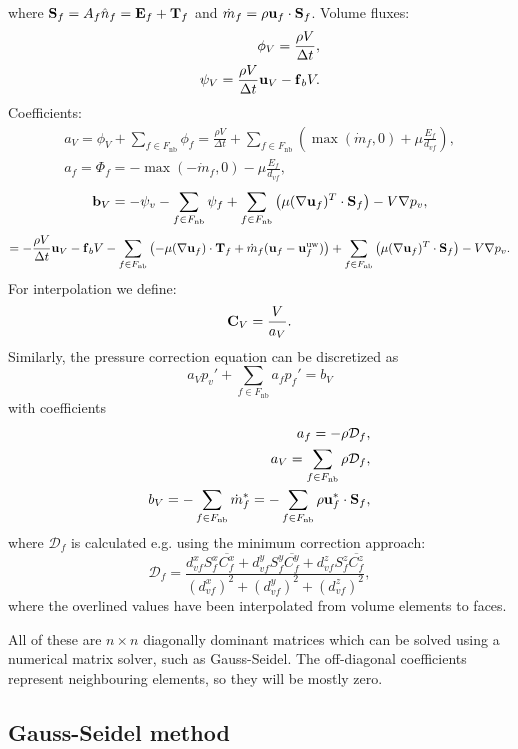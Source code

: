 \documentclass[12pt]{article}
\newcommand{\lb}{\left(}
\newcommand{\rb}{\right)}
\newcommand{\vb}[1]{\text{\textbf{#1}}}
\newcommand{\x}{\text}
\newcommand{\fnb}{F_{\x{nb}}}
\begin{document}
where $\vb S_f = A_f \hat n_f = \vb E_f + \vb T_f$ and $\dot m_f = \rho \vb u_f \cdot \vb S_f$.
Volume fluxes:
\begin{align}
  \phi_V = \frac{\rho V}{\Delta t}, \\
  \psi_V = \frac{\rho V}{\Delta t} \vb u_V - \vb f_b V.
\end{align}
Coefficients:
\begin{align}
  a_V = \phi_V + \sum_{f \in \fnb} \phi_f = \frac{\rho V}{\Delta t} + \sum_{f \in \fnb} \lb \max(\dot m_f, 0) + \mu \frac{E_f}{d_{vf}} \rb, \\
  a_f = \Phi_f = -\max(-\dot m_f, 0) - \mu \frac{E_f}{d_{vf}},
\end{align}
\begin{equation}
  \vb b_V = -\psi_v - \sum_{f \in \fnb} \psi_f + \sum_{f \in \fnb} \lb \mu (\nabla \vb u_f)^T \cdot \vb S_f \rb - V \nabla p_v,
\end{equation}
$$
= - \frac{\rho V}{\Delta t} \vb u_V - \vb f_b V - \sum_{f \in \fnb} \lb - \mu (\nabla \vb u_f) \cdot \vb T_f + \dot m_f (\vb u_f - \vb u_f^{\text{uw}}) \rb + \sum_{f \in \fnb} \lb \mu (\nabla \vb u_f)^T \cdot \vb S_f \rb - V \nabla p_v.
$$
For interpolation we define:
$$
\vb C_V = \frac{V}{a_V}.
$$
Similarly, the pressure correction equation can be discretized as \cite{mou}
\begin{equation}
  a_V p_v' + \sum_{f \in \fnb} a_f p_f' = b_V
\end{equation}
with coefficients
\begin{align}
  a_f = -\rho \mathcal{D}_f, \\
  a_V = \sum_{f \in \fnb} \rho \mathcal{D}_f,\\
  b_V = - \sum_{f \in \fnb} \dot m_f^* = - \sum_{f \in \fnb} \rho \vb u_f^* \cdot \vb S_f,
\end{align}
where $\mathcal{D}_f$ is calculated e.g. using the minimum correction approach:
$$
\mathcal{D}_f = \frac{d_{vf}^x S_f^x \overline{C_f^x} + d_{vf}^y S_f^y \overline{C_f^y} + d_{vf}^z S_f^z \overline{C_f^z}}{(d_{vf}^x)^2 + (d_{vf}^y)^2 + (d_{vf}^z)^2},
$$
where the overlined values have been interpolated from volume elements to faces.

All of these are $n \times n$ diagonally dominant matrices which can be solved using a numerical matrix solver, such as Gauss-Seidel. The off-diagonal coefficients represent neighbouring elements, so they will be mostly zero.

\subsection{Gauss-Seidel method}
\end{document}
